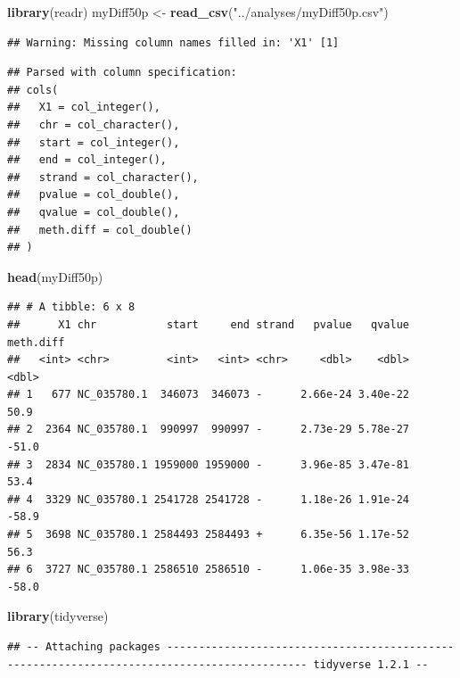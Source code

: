 \documentclass[]{article}
\newenvironment{Shaded}{\begin{snugshade}}{\end{snugshade}}
\newcommand{\KeywordTok}[1]{\textcolor[rgb]{0.13,0.29,0.53}{\textbf{#1}}}
\newcommand{\StringTok}[1]{\textcolor[rgb]{0.31,0.60,0.02}{#1}}
\newcommand{\NormalTok}[1]{#1}
\begin{document}
\begin{Shaded}
\begin{Highlighting}[]
\KeywordTok{library}\NormalTok{(readr)}
\NormalTok{myDiff50p <-}\StringTok{ }\KeywordTok{read_csv}\NormalTok{(}\StringTok{"../analyses/myDiff50p.csv"}\NormalTok{)}
\end{Highlighting}
\end{Shaded}

\begin{verbatim}
## Warning: Missing column names filled in: 'X1' [1]
\end{verbatim}

\begin{verbatim}
## Parsed with column specification:
## cols(
##   X1 = col_integer(),
##   chr = col_character(),
##   start = col_integer(),
##   end = col_integer(),
##   strand = col_character(),
##   pvalue = col_double(),
##   qvalue = col_double(),
##   meth.diff = col_double()
## )
\end{verbatim}

\begin{Shaded}
\begin{Highlighting}[]
\KeywordTok{head}\NormalTok{(myDiff50p)}
\end{Highlighting}
\end{Shaded}

\begin{verbatim}
## # A tibble: 6 x 8
##      X1 chr           start     end strand   pvalue   qvalue meth.diff
##   <int> <chr>         <int>   <int> <chr>     <dbl>    <dbl>     <dbl>
## 1   677 NC_035780.1  346073  346073 -      2.66e-24 3.40e-22      50.9
## 2  2364 NC_035780.1  990997  990997 -      2.73e-29 5.78e-27     -51.0
## 3  2834 NC_035780.1 1959000 1959000 -      3.96e-85 3.47e-81      53.4
## 4  3329 NC_035780.1 2541728 2541728 -      1.18e-26 1.91e-24     -58.9
## 5  3698 NC_035780.1 2584493 2584493 +      6.35e-56 1.17e-52      56.3
## 6  3727 NC_035780.1 2586510 2586510 -      1.06e-35 3.98e-33     -58.0
\end{verbatim}

\begin{Shaded}
\begin{Highlighting}[]
\KeywordTok{library}\NormalTok{(tidyverse)}
\end{Highlighting}
\end{Shaded}

\begin{verbatim}
## -- Attaching packages -------------------------------------------------------------------------------------------- tidyverse 1.2.1 --
\end{verbatim}
\end{document}
